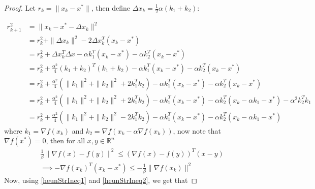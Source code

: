 \begin{proof}
 Let $r_k = \|x_k - x^* \|$, then define $\Delta x_k = \frac{1}{2} \alpha (k_1 + k_2)$:

 \begin{equation}
 \begin{aligned} \label{heunStrIneq1}
r_{k+1}^2 &= \| x_k - x^* -  \Delta x_k\|^2 \\
 &= r_k^2  + \|\Delta x_k\|^2 - 2 \Delta x_k^T (x_k - x^*) \\
 &= r_k^2 + \Delta x_k^T \Delta x - \alpha k_1^T(x_k - x^*) - \alpha k_2^T(x_k - x^*)  \\
 &= r_k^2 + \frac{\alpha^2}{4}(k_1 + k_2)^T (k_1 + k_2) - \alpha k_1^T(x_k - x^*) - \alpha k_2^T(x_k - x^*) \\
 &= r_k^2 + \frac{\alpha^2}{4}(\|k_1\|^2 + \|k_2\|^2 + 2k_1^T k_2) - \alpha k_1^T(x_k - x^*) - \alpha k_2^T(x_k - x^*) \\
 &= r_k^2 + \frac{\alpha^2}{4}(\|k_1\|^2 + \|k_2\|^2 + 2k_1^T k_2) - \alpha k_1^T (x_k - x^*) - \alpha k_2^T (x_k - \alpha k_1 - x^*) - \alpha^2 k_2^T k_1 \\
 &= r_k^2 + \frac{\alpha^2}{4}(\|k_1\|^2 + \|k_2\|^2 - 2k_1^T k_2) - \alpha k_1^T (x_k - x^*) - \alpha k_2^T (x_k - \alpha k_1 - x^*)
 \end{aligned}
 \end{equation}
 where $k_1 = \nabla f(x_k)$ and $k_2 = \nabla f(x_k - \alpha \nabla f(x_k))$, now note that $\nabla f(x^*)=0$, then for all $x,y \in \mathbb{R}^n$
 \begin{equation}
 \begin{aligned} \label{heunStrIneq2}
 \frac{1}{\beta}\| \nabla f(x) - f(y)\|^2 \leq ( \nabla f(x) - f(y))^T(x-y) \\
 \implies - \nabla f(x_k)^T (x_k - x^*) \leq - \frac{1}{\beta}\|\nabla f(x_k)\|^2
 \end{aligned}
 \end{equation}
 Now, using \eqref{heunStrIneq1} and \eqref{heunStrIneq2}, we get that


\end{proof}

